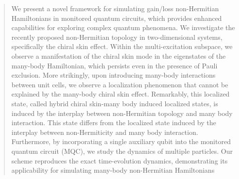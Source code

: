 \documentclass[longbibliography, aps, prx, amsmath, amssymb, amsfonts, twocolumn,superscriptaddress, footinbib]{revtex4-1}
\begin{document}
\begin{abstract}
		We present a novel framework for simulating gain/loss non-Hermitian Hamiltonians in monitored quantum circuits, which provides enhanced capabilities for exploring complex quantum phenomena. We investigate the recently proposed non-Hermitian topology in two-dimensional systems, specifically the chiral skin effect. Within the multi-excitation subspace, we observe a manifestation of the chiral skin mode in the eigenstates of the many-body Hamiltonian, which persists even in the presence of Pauli exclusion. More strikingly, upon introducing many-body interactions between unit cells, we observe a localization phenomenon that cannot be explained by the many-body chiral skin effect. 
		Remarkably, this localized state, called hybrid chiral skin-many body induced localized states, is induced by the interplay between non-Hermitian topology and many body interaction. This state differs from the localized state induced by the interplay between non-Hermiticity and many body interaction.
		Furthermore, by incorporating a single auxiliary qubit into the monitored quantum circuit (MQC), we study the dynamics of multiple particles. Our scheme reproduces the exact time-evolution dynamics, demonstrating its applicability for simulating many-body non-Hermitian Hamiltonians




\end{abstract}
\end{document}

